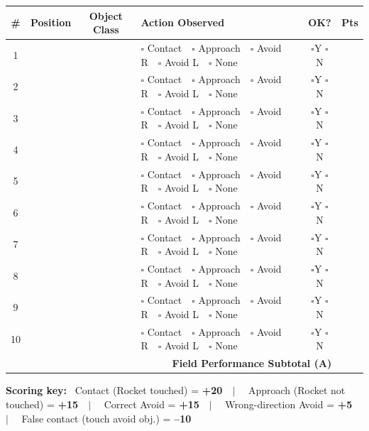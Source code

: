 \documentclass[a4paper]{article}
\begin{document}
{\small
\begin{tabular}{|c|c|c|l|c|c|}
\hline
\textbf{\#} & \textbf{Position} & \textbf{Object Class} & \textbf{Action Observed} & \textbf{OK?} & \textbf{Pts} \\
\hline
1 & & & $\square$ Contact~~$\square$ Approach~~$\square$ Avoid R~~$\square$ Avoid L~~$\square$ None & $\square$Y $\square$N & \\[2pt]
\hline
2 & & & $\square$ Contact~~$\square$ Approach~~$\square$ Avoid R~~$\square$ Avoid L~~$\square$ None & $\square$Y $\square$N & \\[2pt]
\hline
3 & & & $\square$ Contact~~$\square$ Approach~~$\square$ Avoid R~~$\square$ Avoid L~~$\square$ None & $\square$Y $\square$N & \\[2pt]
\hline
4 & & & $\square$ Contact~~$\square$ Approach~~$\square$ Avoid R~~$\square$ Avoid L~~$\square$ None & $\square$Y $\square$N & \\[2pt]
\hline
5 & & & $\square$ Contact~~$\square$ Approach~~$\square$ Avoid R~~$\square$ Avoid L~~$\square$ None & $\square$Y $\square$N & \\[2pt]
\hline
6 & & & $\square$ Contact~~$\square$ Approach~~$\square$ Avoid R~~$\square$ Avoid L~~$\square$ None & $\square$Y $\square$N & \\[2pt]
\hline
7 & & & $\square$ Contact~~$\square$ Approach~~$\square$ Avoid R~~$\square$ Avoid L~~$\square$ None & $\square$Y $\square$N & \\[2pt]
\hline
8 & & & $\square$ Contact~~$\square$ Approach~~$\square$ Avoid R~~$\square$ Avoid L~~$\square$ None & $\square$Y $\square$N & \\[2pt]
\hline
9 & & & $\square$ Contact~~$\square$ Approach~~$\square$ Avoid R~~$\square$ Avoid L~~$\square$ None & $\square$Y $\square$N & \\[2pt]
\hline
10 & & & $\square$ Contact~~$\square$ Approach~~$\square$ Avoid R~~$\square$ Avoid L~~$\square$ None & $\square$Y $\square$N & \\[2pt]
\hline
\multicolumn{5}{|r|}{\textbf{Field Performance Subtotal (A)}} & \\
\hline
\end{tabular}
}

\vspace{0.3em}

{\scriptsize
\textbf{Scoring key:}~
Contact (Rocket touched) = \textbf{+20}~~$\vert$~~
Approach (Rocket not touched) = \textbf{+15}~~$\vert$~~
Correct Avoid = \textbf{+15}~~$\vert$~~
Wrong-direction Avoid = \textbf{+5}~~$\vert$~~
False contact (touch avoid obj.) = \textbf{--10}
}
\end{document}
